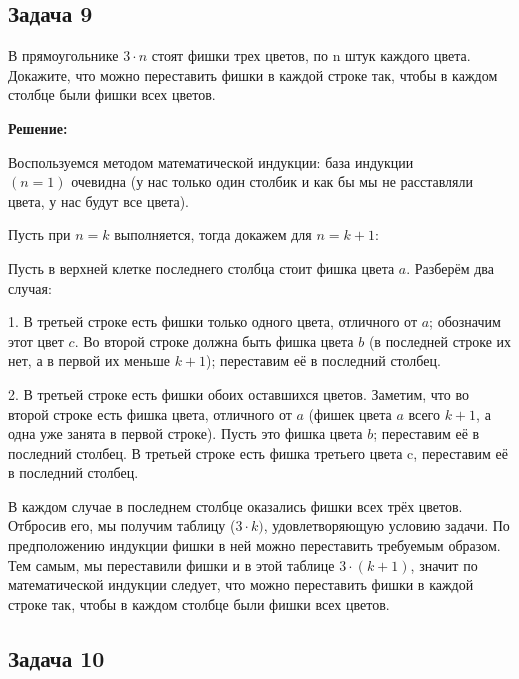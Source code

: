 \documentclass[a4paper,14pt]{article} %
\begin{document}
\newpage
\begin{center}
\subsection{Задача 9}
\end{center}

В прямоугольнике $3\cdot n$ стоят фишки трех цветов, по n штук каждого
цвета. Докажите, что можно переставить фишки в каждой строке так,
чтобы в каждом столбце были фишки всех цветов.


\begin{center}
\bfseries
{\Large Решение: }
\end{center}


Воспользуемся методом математической индукции: база индукции \\$(n = 1)$ очевидна (у нас только один столбик и как бы мы не расставляли цвета, у нас будут все цвета).

Пусть при $n = k$ выполняется, тогда докажем для $n = k+1$:

Пусть в верхней клетке последнего столбца стоит фишка цвета $a$. Разберём два случая:

1. В третьей строке есть фишки только одного цвета, отличного от $a$; обозначим этот цвет $c$. Во второй строке должна быть фишка цвета $b$ (в последней строке их нет, а в первой их меньше $k+1$); переставим её в последний столбец.

2. В третьей строке есть фишки обоих оставшихся цветов. Заметим, что во второй строке есть фишка цвета, отличного от $a$ (фишек цвета $a$ всего $k+1$, а одна уже занята в первой строке). Пусть это фишка цвета $b$; переставим её в последний столбец. В третьей строке есть фишка третьего цвета c, переставим её в последний столбец.

 В каждом случае в последнем столбце оказались фишки всех трёх цветов. Отбросив его, мы получим таблицу  ($3\cdot k)$,  удовлетворяющую условию задачи. По предположению индукции фишки в ней можно переставить требуемым образом. Тем самым, мы переставили фишки и в этой таблице $3 \cdot (k+1)$, значит по математической индукции следует, что можно переставить фишки в каждой строке так, чтобы в каждом столбце были фишки всех цветов.
 \newpage
\begin{center}
\subsection{Задача 10}
\end{center}
\end{document}

